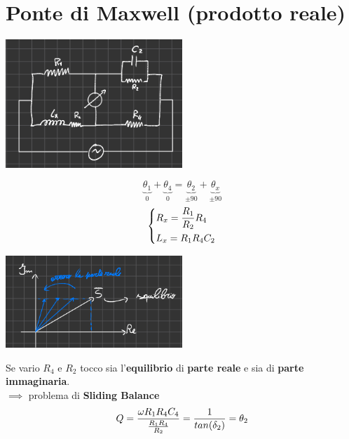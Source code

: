 \section{Ponte di Maxwell (prodotto reale)}
  \begin{center}
    \includegraphics[width=0.50\textwidth]{Images/figure34.png}
  \end{center}
\begin{equation*}
    \underbrace{\theta_1}_{0} + \underbrace{\theta_4}_0 = \underbrace{\theta_2}_{\pm 90} + \underbrace{\theta_x}_{\pm 90}
\end{equation*}
\begin{equation*}
    \begin{dcases}
        R_x = \frac{R_1}{R_2} R_4\\
        L_x = R_1 R_4 C_2
    \end{dcases}
\end{equation*}
  \begin{center}
    \includegraphics[width=0.50\textwidth]{Images/figure35.png}
  \end{center}
Se vario $R_4$ e $R_2$ tocco sia l'\textbf{equilibrio} di \textbf{parte reale} e sia di \textbf{parte immaginaria}.\\
$\implies$ problema di \textbf{Sliding Balance}
\begin{equation*}
    Q = \frac{\omega R_1 R_4 C_4}{\frac{R_1 R_4}{R_2}} = \frac{1}{tan(\delta_2)} = \theta_2
\end{equation*}
